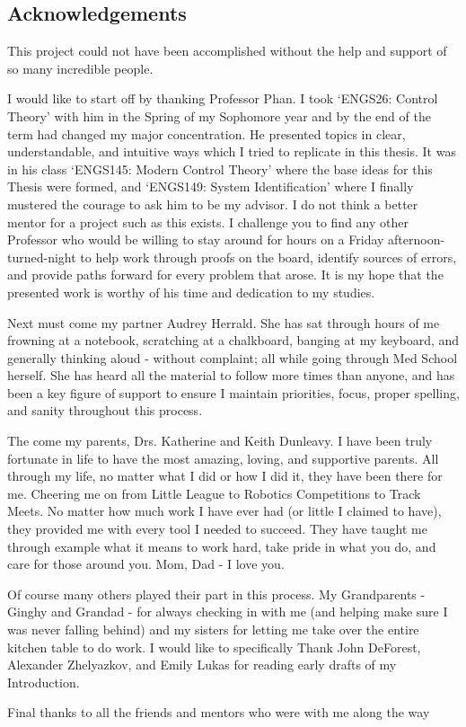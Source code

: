 \pagestyle{plain}
\begin{center}


\section*{Acknowledgements}


\end{center}
This project could not have been accomplished without the help and support of so many incredible people.

I would like to start off by thanking Professor Phan. I took `ENGS26: Control Theory' with him in the Spring of my Sophomore year and by the end of the term had changed my major concentration. He presented topics in clear, understandable, and intuitive ways which I tried to replicate in this thesis. It was in his class `ENGS145: Modern Control Theory' where the base ideas for this Thesis were formed, and `ENGS149: System Identification' where I finally mustered the courage to ask him to be my advisor. I do not think a better mentor for a project such as this exists. I challenge you to find any other Professor who would be willing to stay around for hours on a Friday afternoon-turned-night to help work through proofs on the board, identify sources of errors, and provide paths forward for every problem that arose. It is my hope that the presented work is worthy of his time and dedication to my studies.

Next must come my partner Audrey Herrald. She has sat through hours of me frowning at a notebook, scratching at a chalkboard, banging at my keyboard, and generally thinking aloud - without complaint; all while going through Med School herself. She has heard all the material to follow more times than anyone, and has been a key figure of support to ensure I maintain priorities, focus, proper spelling, and sanity throughout this process.

The come my parents, Drs. Katherine and Keith Dunleavy. I have been truly fortunate in life to have the most amazing, loving, and supportive parents. All through my life, no matter what I did or how I did it, they have been there for me. Cheering me on from Little League to Robotics Competitions to Track Meets. No matter how much work I have ever had (or little I claimed to have), they provided me with every tool I needed to succeed. They have taught me through example what it means to work hard, take pride in what you do, and care for those around you. Mom, Dad - I love you.

Of course many others played their part in this process. My Grandparents - Ginghy and Grandad - for always checking in with me (and helping make sure I was never falling behind) and my sisters for letting me take over the entire kitchen table to do work. I would like to specifically Thank John DeForest, Alexander Zhelyazkov, and Emily Lukas for reading early drafts of my Introduction. 

Final thanks to all the friends and mentors who were with me along the way
\cleardoublepage%
